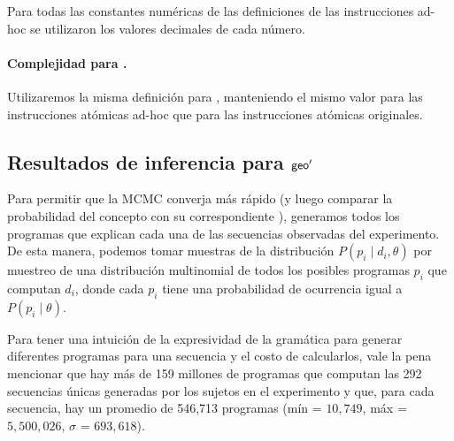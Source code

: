 Para todas las constantes numéricas de las definiciones de las instrucciones ad-hoc se utilizaron los valores decimales de cada número.

\paragraph{Complejidad para \gramgeoprima.} 

Utilizaremos la misma definición para \mdlgeo, manteniendo el mismo valor para las instrucciones atómicas ad-hoc que para las instrucciones atómicas originales.

\subsection{Resultados de inferencia para ${\sf geo'}$}


Para permitir que la MCMC converja más rápido (y luego comparar la probabilidad del concepto con su correspondiente \mdlgeo), generamos todos los programas que explican cada una de las secuencias observadas del experimento. De esta manera, podemos tomar muestras de la distribución $P(p_i \mid d_i, \theta)$ por muestreo de una distribución multinomial de todos los posibles programas $p_i$ que computan $d_i$, donde cada $p_i$ tiene una probabilidad de ocurrencia igual a $P(p_i \mid \theta)$.


Para tener una intuición de la expresividad de la gramática para generar diferentes programas para una secuencia y el costo de calcularlos, vale la pena mencionar que hay más de 159 millones de programas que computan las 292 secuencias únicas generadas por los sujetos en el experimento y que, para cada secuencia, hay un promedio de 546,713 programas (mín = $10,749$, máx = $5,500,026$, $\sigma$ = $693,618$).


